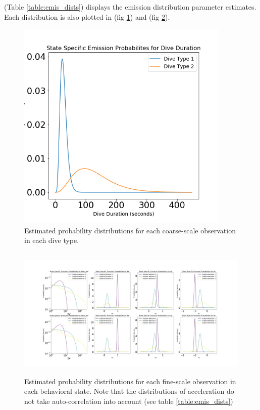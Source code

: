 (Table \ref{table:emis_dists}) displays the emission distribution parameter estimates. Each distribution is also plotted in (fig \ref{fig:coarse_emis}) and (fig \ref{fig:fine_emis}).
%
\begin{figure}[ht]
	\centering
	\includegraphics[height=4in]{../Plots/coarse-emissions.png}
	\caption{Estimated probability distributions for each coarse-scale observation in each dive type.}
	\label{fig:coarse_emis}
\end{figure}
%
\begin{figure}[ht]
	\centering
	\includegraphics[height=2.5in]{../Plots/fine-emissions.png}
	\caption{Estimated probability distributions for each fine-scale observation in each behavioral state. Note that the distributions of acceleration do not take auto-correlation into account (see table \ref{table:emis_dists})}
	\label{fig:fine_emis}
\end{figure}
%

